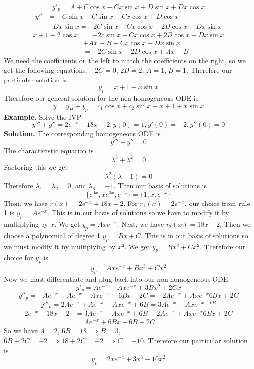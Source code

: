 \documentclass[openany]{report}
\begin{document}
\[y'_p = A + C\cos x - Cx\sin x + D\sin x + Dx\cos x\]
\begin{align*}
    y'' &= -C\sin x - C\sin x - Cx\cos x + D\cos x\\
    &- Dx\sin x = -2C\sin x - Cx\cos x + 2D \cos x - Dx \sin x  
\end{align*}
\begin{align*}
    x+1 + 2\cos x &= -2c\sin x - Cx\cos x + 2D\cos x - Dx\sin x \\
    &+ Ax + B + Cx \cos x + Dx \sin x\\
    &=-2C\sin x + 2D\cos x + Ax + B
\end{align*}
We need the coefficients on the left to match the coefficients on the right, so we get the following equations, $-2C = 0$, $2D = 2$, $A = 1$, $B = 1$. Therefore our particular solution is
\[y_p = x + 1 + x\sin x \]
Therefore our general solution for the non homogeneous ODE is 
\[y = y_H + y_p = c_1\cos x + c_2\sin x + x + 1 + x\sin x\]
\textbf{Example.} Solve the IVP 
\[y''' + y'' = 2e^{-x} + 18x - 2; y(0) = 1, y'(0) = -2, y''(0) = 0\]
\textbf{Solution.} The corresponding homogeneous ODE is
\[y''' + y'' = 0\]
The characteristic equation is
\[\lambda^3 + \lambda ^2 = 0\]
Factoring this we get
\[\lambda^2(\lambda + 1) = 0\]
Therefore $\lambda_1 = \lambda_2 = 0$, and $\lambda_3 = -1$. Then our basis of solutions is 
\[\{e^{0x}, xe^{0x},e^{-x}\} = \{1, x, e^{-x}\} \]
Then, we have $r(x) = 2e^{-x} + 18x - 2$. For $r_1(x) = 2e^{-x}$, our choice from rule 1 is $y_p = Ae^{-x}$. This is in our basis of solutions so we have to modify it by multiplying by $x$. We get $y_p = Axe^{-x}$. Next, we have $r_2(x) = 18x-2$. Then we choose a polynomial of degree 1 $y_p = Bx + C$. This is in our basis of solutions so we must modify it by multiplying by $x^2$. We get $y_p = Bx^3 + Cx^2$. Therefore our choice for $y_p$ is
\[y_p = Axe^{-x} + Bx^3 + Cx^2\]
Now we must differentiate and plug back into our non homogeneous ODE
\[y'_p = Ae^{-x} - Axe^{-x} + 3Bx^2 + 2Cx\]
\[y''_p = -Ae^{-x} - Ae^{-x} + Axe^{-x} + 6Bx + 2C= -2Ae^{-x} + Axe^{-x} 6Bx + 2C\]
\[y'''_p = 2Ae^{-x} + Ae^{-x} - Axe^{-x} + 6B = 3Ae^{-x} - Axe^{-x + 6B}\]
\begin{align*}
    2e^{-x} + 18x - 2 &= 3Ae^{-x} - Axe^{-x} + 6B -2Ae^{-x} + Axe^{-x} 6Bx + 2C\\
    &= Ae^{-x} + 6Bx + 6B + 2C
\end{align*}
So we have $A = 2$, $6B = 18 \implies B = 3$, $6B + 2C = -2 \implies 18 + 2C = -2 \implies C = -10$. Therefore our particular solution is
\[y_p = 2xe^{-x} + 3x^3 - 10x^2\]
\end{document}
